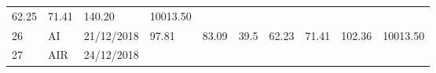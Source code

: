 \documentclass[
  11pt,
]{article}
\begin{document}
\begin{longtable}[]{@{}llllllllll@{}}
\begin{minipage}[t]{0.07\columnwidth}
62.25\strut
\end{minipage} & \begin{minipage}[t]{0.07\columnwidth}\raggedright
71.41\strut
\end{minipage} & \begin{minipage}[t]{0.08\columnwidth}\raggedright
140.20\strut
\end{minipage} & \begin{minipage}[t]{0.09\columnwidth}\raggedright
10013.50\strut
\end{minipage}\tabularnewline
\begin{minipage}[t]{0.05\columnwidth}\raggedright
26\strut
\end{minipage} & \begin{minipage}[t]{0.07\columnwidth}\raggedright
AI\strut
\end{minipage} & \begin{minipage}[t]{0.11\columnwidth}\raggedright
21/12/2018\strut
\end{minipage} & \begin{minipage}[t]{0.07\columnwidth}\raggedright
97.81\strut
\end{minipage} & \begin{minipage}[t]{0.07\columnwidth}\raggedright
83.09\strut
\end{minipage} & \begin{minipage}[t]{0.07\columnwidth}\raggedright
39.5\strut
\end{minipage} & \begin{minipage}[t]{0.07\columnwidth}\raggedright
62.23\strut
\end{minipage} & \begin{minipage}[t]{0.07\columnwidth}\raggedright
71.41\strut
\end{minipage} & \begin{minipage}[t]{0.08\columnwidth}\raggedright
102.36\strut
\end{minipage} & \begin{minipage}[t]{0.09\columnwidth}\raggedright
10013.50\strut
\end{minipage}\tabularnewline
\begin{minipage}[t]{0.05\columnwidth}\raggedright
27\strut
\end{minipage} & \begin{minipage}[t]{0.07\columnwidth}\raggedright
AIR\strut
\end{minipage} & \begin{minipage}[t]{0.11\columnwidth}\raggedright
24/12/2018\strut
\end{minipage} & \begin{minipage}[t]{0.07\columnwidth}\raggedright

\end{minipage}
\end{longtable}
\end{document}
